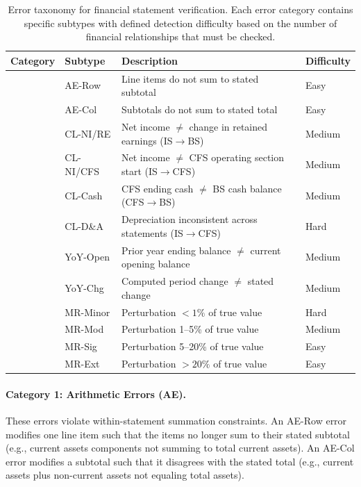\documentclass[11pt]{article}
\begin{document}
\begin{table}[t]
\centering
\small
\caption{Error taxonomy for financial statement verification.
Each error category contains specific subtypes with defined detection difficulty based on the number of financial relationships that must be checked.}
\label{tab:taxonomy}
\begin{tabular}{p{}p{}p{}p{}}
\toprule
\textbf{Category} & \textbf{Subtype} & \textbf{Description} & \textbf{Difficulty} \\
\midrule
{}
  & AE-Row & Line items do not sum to stated subtotal & Easy \\
  & AE-Col & Subtotals do not sum to stated total & Easy \\
\midrule
{}
  & CL-NI/RE & Net income $\neq$ change in retained earnings (IS$\to$BS) & Medium \\
  & CL-NI/CFS & Net income $\neq$ CFS operating section start (IS$\to$CFS) & Medium \\
  & CL-Cash & CFS ending cash $\neq$ BS cash balance (CFS$\to$BS) & Medium \\
  & CL-D\&A & Depreciation inconsistent across statements (IS$\to$CFS) & Hard \\
\midrule
{}
  & YoY-Open & Prior year ending balance $\neq$ current opening balance & Medium \\
  & YoY-Chg & Computed period change $\neq$ stated change & Medium \\
\midrule
{}
  & MR-Minor & Perturbation $<1\%$ of true value & Hard \\
  & MR-Mod & Perturbation 1--5\% of true value & Medium \\
  & MR-Sig & Perturbation 5--20\% of true value & Easy \\
  & MR-Ext & Perturbation $>20\%$ of true value & Easy \\
\bottomrule
\end{tabular}
\end{table}

\paragraph{Category 1: Arithmetic Errors (AE).}
These errors violate within-statement summation constraints.
An AE-Row error modifies one line item such that the items no longer sum to their stated subtotal (e.g., current assets components not summing to total current assets).
An AE-Col error modifies a subtotal such that it disagrees with the stated total (e.g., current assets plus non-current assets not equaling total assets).
\end{document}
